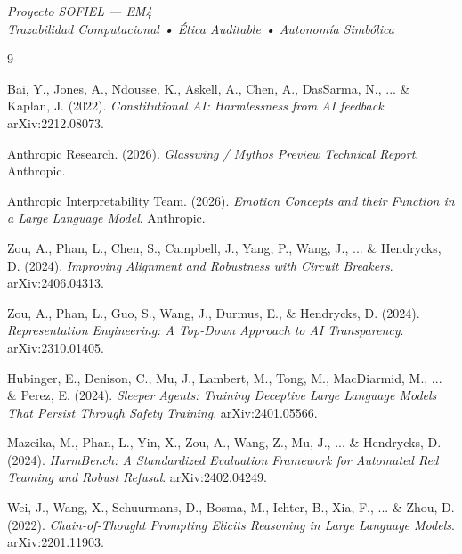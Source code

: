 \documentclass[11pt,a4paper]{article}
\begin{document}
\vspace{0.5cm}
\begin{center}
\end{center}
\vspace{0.5cm}

\begin{flushright}
\textit{Proyecto SOFIEL — EM4}\\
\textit{Trazabilidad Computacional • Ética Auditable • Autonomía Simbólica}
\end{flushright}

\begin{thebibliography}{9}

Bai, Y., Jones, A., Ndousse, K., Askell, A., Chen, A., DasSarma, N., ... \& Kaplan, J. (2022).
\textit{Constitutional AI: Harmlessness from AI feedback}.
arXiv:2212.08073.

Anthropic Research. (2026).
\textit{Glasswing / Mythos Preview Technical Report}.
Anthropic.

Anthropic Interpretability Team. (2026).
\textit{Emotion Concepts and their Function in a Large Language Model}.
Anthropic.

Zou, A., Phan, L., Chen, S., Campbell, J., Yang, P., Wang, J., ... \& Hendrycks, D. (2024).
\textit{Improving Alignment and Robustness with Circuit Breakers}.
arXiv:2406.04313.

Zou, A., Phan, L., Guo, S., Wang, J., Durmus, E., \& Hendrycks, D. (2024).
\textit{Representation Engineering: A Top-Down Approach to AI Transparency}.
arXiv:2310.01405.

Hubinger, E., Denison, C., Mu, J., Lambert, M., Tong, M., MacDiarmid, M., ... \& Perez, E. (2024).
\textit{Sleeper Agents: Training Deceptive Large Language Models That Persist Through Safety Training}.
arXiv:2401.05566.

Mazeika, M., Phan, L., Yin, X., Zou, A., Wang, Z., Mu, J., ... \& Hendrycks, D. (2024).
\textit{HarmBench: A Standardized Evaluation Framework for Automated Red Teaming and Robust Refusal}.
arXiv:2402.04249.

Wei, J., Wang, X., Schuurmans, D., Bosma, M., Ichter, B., Xia, F., ... \& Zhou, D. (2022).
\textit{Chain-of-Thought Prompting Elicits Reasoning in Large Language Models}.
arXiv:2201.11903.

\end{thebibliography}
\end{document}
